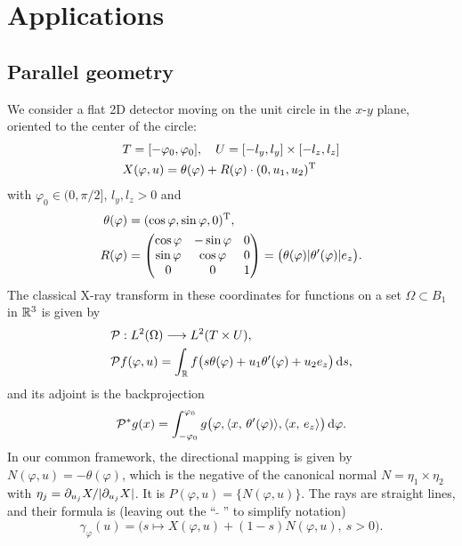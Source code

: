 \documentclass{amsart}
\renewcommand*{\phi}{\varphi}
\begin{document}
\section{Applications}


\subsection{Parallel geometry}

We consider a flat 2D detector moving on the unit circle in the $x$-$y$ plane, oriented to the center of the circle:
%
\begin{align*}
 & T = [-\phi_0, \phi_0],\quad U = [-l_y, l_y] \times [-l_z, l_z] \\
 & X(\phi, u) = \theta(\phi) + R(\phi) \cdot \TRANSP{(0, u_1, u_2)}
\end{align*}
%
with $\phi_0 \in (0, \pi/2]$, $l_y, l_z > 0$ and
%
\begin{align}
 \theta(\phi) &= \TRANSP{(\cos\phi, \sin\phi, 0)}, \\ 
 R(\phi) &=
 \begin{pmatrix}
  \cos\phi & -\sin\phi & 0 \\
  \sin\phi & \cos\phi & 0 \\
  0 & 0 & 1
 \end{pmatrix}
 = \big(\theta(\phi) | \theta'(\phi) | e_z\big).
\end{align}
%
The classical X-ray transform in these coordinates for functions on a set $\Omega \subset B_1$ in ${\mathbb{R}}^3$ is given by
%
\begin{align}
 &\OPP: L^2(\Omega) \Lto L^2(T \times U), \notag \\
 \label{eq:parallel_fwdproj}
 &\OPP f(\phi, u) = \int_\RR f\big(s\theta(\phi) + u_1 \theta'(\phi) + u_2 e_z\big)\, \D s,
\end{align}
%
and its adjoint is the backprojection
%
\begin{equation}
 \label{eq:parallel_backproj}
 \DUALOPP g(x) = \int_{-\phi_0}^{\phi_0} g\big(\phi, \INNER{x}{\theta'(\phi)}, \INNER{x}{e_z}\big)\, \D \phi.
\end{equation}
%
In our common framework, the directional mapping is given by $N(\phi, u) = -\theta(\phi)$, which is the negative of the canonical normal 
$N = \eta_1 \times \eta_2$ with $\eta_j = \partial_{u_j} X / |\partial_{u_j} X|$. It is $P(\phi, u) = \lbrace N(\phi, u)\rbrace$.
The rays are straight lines, and their formula is (leaving out the ``$\,\widetilde{\ }\,$'' to simplify notation)
%
\begin{equation*}
 \gamma_\phi(u) = \big( s \mapsto X(\phi, u) + (1-s) N(\phi, u),\ s > 0 \big).
\end{equation*}
\end{document}
